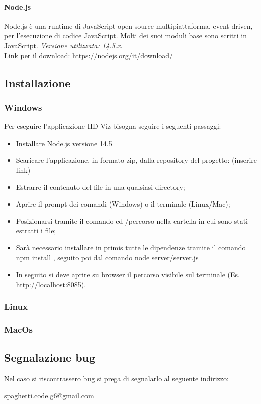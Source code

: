 \documentclass[../manuale_utente.tex]{subfiles}
\begin{document}
\paragraph{Node.js}
    \label{par:node}
Node.js è una runtime di JavaScript open-source multipiattaforma, event-driven, per l’esecuzione di codice JavaScript. Molti dei suoi moduli base sono scritti in JavaScript. 
\emph{Versione utilizzata: 14.5.x}.\\
Link per il download: \url{https://nodejs.org/it/download/}

\subsection{Installazione}
    \label{sub:inst}
\subsubsection{Windows}
    \label{subsub:wind_inst}

Per eseguire l’applicazione HD-Viz bisogna seguire i seguenti passaggi:
\begin{itemize}
\item Installare Node.js versione 14.5
\item Scaricare l’applicazione, in formato zip, dalla repository del progetto: (inserire link)
\item Estrarre il contenuto del file in una qualsiasi directory; 
\item Aprire il prompt dei comandi (Windows) o il terminale (Linux/Mac); 
\item Posizionarsi tramite il comando cd /percorso nella cartella in cui sono stati estratti i file;
\item Sarà necessario installare in primis tutte le dipendenze tramite il comando npm install , seguito poi dal comando node server/server.js
\item In seguito si deve aprire su browser il percorso visibile sul terminale (Es. \url{http://localhost:8085}).
\end{itemize}

\subsubsection{Linux}
    \label{subsub:linux_inst}

\subsubsection{MacOs}
    \label{subsub:mac_inst}

\subsection{Segnalazione bug}
Nel caso si riscontrassero bug si prega di segnalarlo al seguente indirizzo:\\
\begin{center}\href{mailto:spaghetti.code.g6@gmail.com}{spaghetti.code.g6@gmail.com}\end{center}
\end{document}
